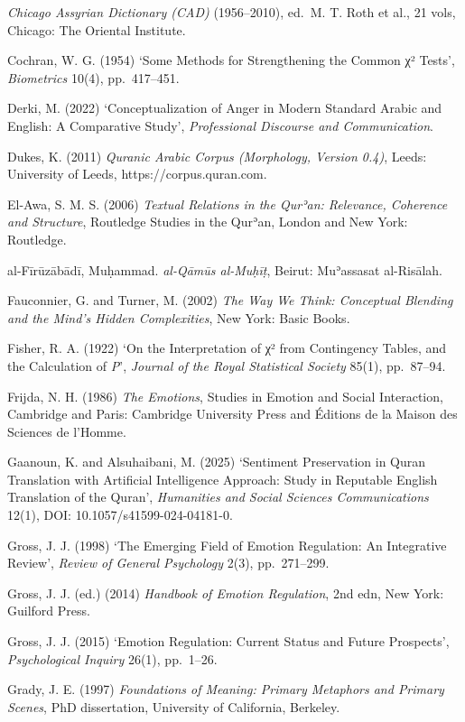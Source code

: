 \documentclass[11pt,a4paper]{article}
\begin{document}
\emph{Chicago Assyrian Dictionary (CAD)} (1956--2010), ed.~M. T. Roth et
al., 21 vols, Chicago: The Oriental Institute.

Cochran, W. G. (1954) `Some Methods for Strengthening the Common χ²
Tests', \emph{Biometrics} 10(4), pp.~417--451.

Derki, M. (2022) `Conceptualization of Anger in Modern Standard Arabic
and English: A Comparative Study', \emph{Professional Discourse and
Communication}.

Dukes, K. (2011) \emph{Quranic Arabic Corpus (Morphology, Version 0.4)},
Leeds: University of Leeds, https://corpus.quran.com.

El-Awa, S. M. S. (2006) \emph{Textual Relations in the Qurʾan:
Relevance, Coherence and Structure}, Routledge Studies in the Qurʾan,
London and New York: Routledge.

al-Fīrūzābādī, Muḥammad. \emph{al-Qāmūs al-Muḥīṭ}, Beirut: Muʾassasat
al-Risālah.

Fauconnier, G. and Turner, M. (2002) \emph{The Way We Think: Conceptual
Blending and the Mind's Hidden Complexities}, New York: Basic Books.

Fisher, R. A. (1922) `On the Interpretation of χ² from Contingency
Tables, and the Calculation of \emph{P}', \emph{Journal of the Royal
Statistical Society} 85(1), pp.~87--94.

Frijda, N. H. (1986) \emph{The Emotions}, Studies in Emotion and Social
Interaction, Cambridge and Paris: Cambridge University Press and
Éditions de la Maison des Sciences de l'Homme.

Gaanoun, K. and Alsuhaibani, M. (2025) `Sentiment Preservation in Quran
Translation with Artificial Intelligence Approach: Study in Reputable
English Translation of the Quran', \emph{Humanities and Social Sciences
Communications} 12(1), DOI: 10.1057/s41599-024-04181-0.

Gross, J. J. (1998) `The Emerging Field of Emotion Regulation: An
Integrative Review', \emph{Review of General Psychology} 2(3),
pp.~271--299.

Gross, J. J. (ed.) (2014) \emph{Handbook of Emotion Regulation}, 2nd
edn, New York: Guilford Press.

Gross, J. J. (2015) `Emotion Regulation: Current Status and Future
Prospects', \emph{Psychological Inquiry} 26(1), pp.~1--26.

Grady, J. E. (1997) \emph{Foundations of Meaning: Primary Metaphors and
Primary Scenes}, PhD dissertation, University of California, Berkeley.
\end{document}

